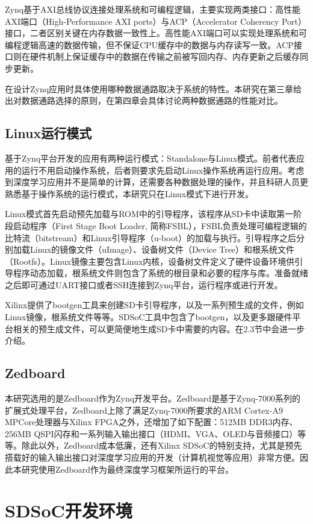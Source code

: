 Zynq基于AXI总线协议连接处理系统和可编程逻辑，主要实现两类接口：高性能AXI端口（High-Performance AXI ports）与ACP（Accelerator Coherency Port）接口，二者区别关键在内存数据一致性上。高性能AXI端口可以实现处理系统和可编程逻辑高速的数据传输，但不保证CPU缓存中的数据与内存读写一致。ACP接口则在硬件机制上保证缓存中的数据在传输之前被写回内存、内存更新之后缓存同步更新。

在设计Zynq应用时具体使用哪种数据通路取决于系统的特性。本研究在第三章给出对数据通路选择的原则，在第四章会具体讨论两种数据通路的性能对比。

\subsection{Linux运行模式}
基于Zynq平台开发的应用有两种运行模式：Standalone与Linux模式。前者代表应用的运行不用启动操作系统，后者则要求先启动Linux操作系统再运行应用。考虑到深度学习应用并不是简单的计算，还需要各种数据处理的操作，并且科研人员更熟悉基于操作系统的运行模式，本研究只在Linux模式下进行开发。

Linux模式首先启动预先加载与ROM中的引导程序，该程序从SD卡中读取第一阶段启动程序（First Stage Boot Loader, 简称FSBL），FSBL负责处理可编程逻辑的比特流（bitstream）和Linux引导程序（u-boot）的加载与执行。引导程序之后分别加载Linux的镜像文件（uImage）、设备树文件（Device Tree）和根系统文件（Rootfs）。Linux镜像主要包含Linux内核，设备树文件定义了硬件设备环境供引导程序动态加载，根系统文件则包含了系统的根目录和必要的程序与库。准备就绪之后即可通过UART接口或者SSH连接到Zynq平台，运行程序或进行开发。

Xilinx提供了bootgen工具来创建SD卡引导程序，以及一系列预生成的文件，例如Linux镜像，根系统文件等等。SDSoC工具中包含了bootgen，以及更多跟硬件平台相关的预生成文件，可以更简便地生成SD卡中需要的内容。在2.3节中会进一步介绍。

\subsection{Zedboard}
本研究选用的是Zedboard作为Zynq开发平台。Zedboard\supercite{zed}是基于Zynq-7000系列的扩展式处理平台，Zedboard上除了满足Zynq-7000所要求的ARM Cortex-A9 MPCore处理器与Xilinx FPGA之外，还增加了如下配置：512MB DDR3内存、256MB QSPI闪存和一系列输入输出接口（HDMI、VGA、OLED与音频接口）等等。除此以外，Zedboard成本低廉，还有Xilinx SDSoC的特别支持，尤其是预先搭载好的输入输出接口对深度学习应用的开发（计算机视觉等应用）非常方便。因此本研究使用Zedboard作为最终深度学习框架所运行的平台。

\section{SDSoC开发环境}

